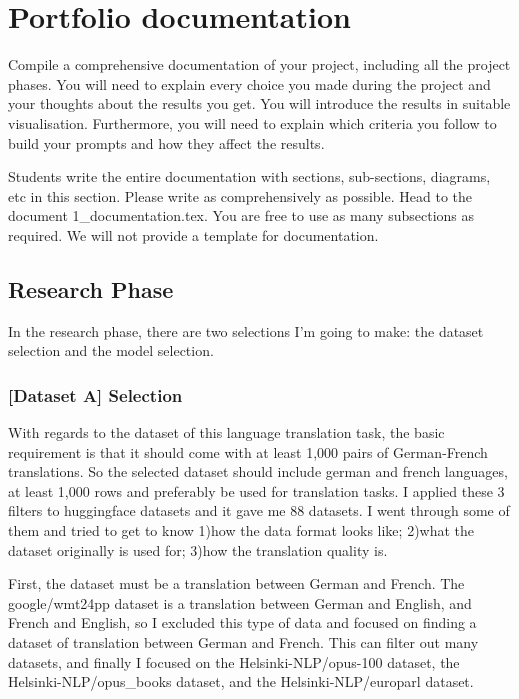 \setcounter{page}{1}
\section{Portfolio documentation}
\label{sec:documentation}

Compile a comprehensive documentation of your project, including all the project phases. You will need to explain every choice you made during the project and your thoughts about the results you get. You will introduce the results in suitable visualisation. Furthermore, you will need to explain which criteria you follow to build your prompts and how they affect the results. 

Students write the entire documentation with sections, sub-sections, diagrams, etc in this section. Please write as comprehensively as possible. Head to the document 1\_documentation.tex. You are free to use as many subsections as required. We will not provide a template for documentation. 

\subsection{Research Phase}
\label{subsec:research}
In the research phase, there are two selections I'm going to make: the dataset selection and the model selection.

\subsubsection{[Dataset A] Selection}
With regards to the dataset of this language translation task,
the basic requirement is that it should come with at least 1,000 pairs of German-French translations.
So the selected dataset should include german and french languages, at least 1,000 rows and preferably be used for translation tasks.
I applied these 3 filters to huggingface datasets and it gave me 88 datasets. 
I went through some of them and tried to get to know
1)how the data format looks like; 
2)what the dataset originally is used for;
3)how the translation quality is. 

First, the dataset must be a translation between German and French.
The google/wmt24pp dataset is a translation between German and English, and French and English,
so I excluded this type of data and focused on finding a dataset of translation between German and French.
This can filter out many datasets, and finally 
I focused on the Helsinki-NLP/opus-100\cite{zhang-etal-2020-improving}\cite{tiedemann-2012-parallel} dataset, 
the Helsinki-NLP/opus\_books dataset, and the Helsinki-NLP/europarl\cite{koehn-2005-europarl} dataset.

